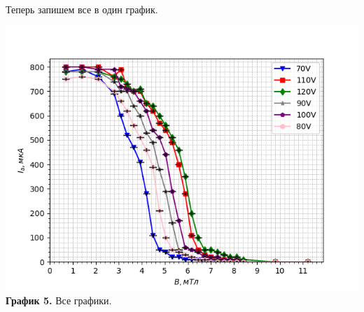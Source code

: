 \documentclass[a4paper, 12pt]{article}
\begin{document}
\begin{figure}[H]
    \centering
    \hfill
\end{figure}

Теперь запишем все в один график.

\begin{center}
\includegraphics[width = \textwidth]{data/magnet/graphs/all.png}\\
\textbf{График 5. } Все графики.
\end{center}
\end{document}

